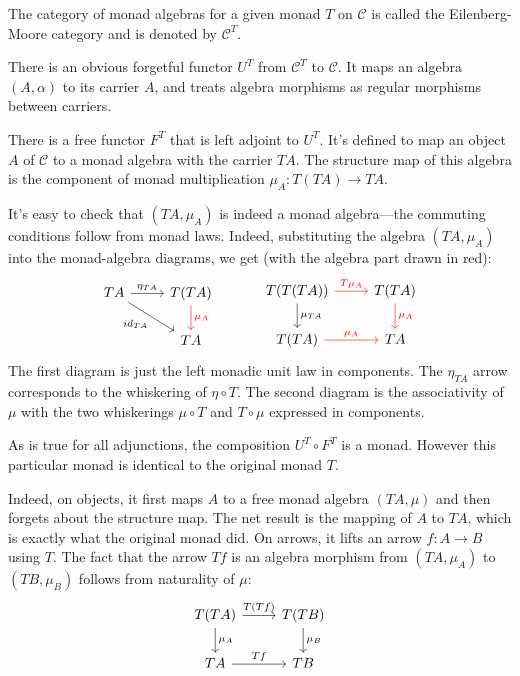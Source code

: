 \documentclass[DaoFP]{subfiles}
\begin{document}
The category of monad algebras for a given monad $T$ on $ \mathcal{C}$ is called the Eilenberg-Moore category and is denoted by $ \mathcal{C}^T$. 

There is an obvious forgetful functor $U^T$ from $ \mathcal{C}^T$ to $ \mathcal{C}$. It maps an algebra $(A, \alpha)$ to its carrier $A$, and treats algebra morphisms as regular morphisms between carriers. 

There is a free functor $F^T$ that is left adjoint to $U^T$. It's defined to map an object $A$ of $ \mathcal{C}$ to a monad algebra with the carrier $T A$. The structure map of this algebra is the component of monad multiplication $\mu_A \colon T(TA) \to TA$. 

It's easy to check that $(T A, \mu_A)$ is indeed a monad algebra---the commuting conditions follow from monad laws. Indeed, substituting the algebra $(T A, \mu_A)$ into the monad-algebra diagrams, we get (with the algebra part drawn in red):
\[
 \begin{tikzcd}
 T A
 \arrow[r, "\eta_{TA}"]
 \arrow[dr, "id_{TA}"']
 & T(T A)
 \arrow[d, red, "\mu_A"]
 \\
 & T A
 \end{tikzcd}
  \hspace{30pt}
 \begin{tikzcd}
T(T(T A))
\arrow[r, red, "T \mu_A "]
\arrow[d, "\mu_{TA}"]
&T(TA)
\arrow[d, red, "\mu_A"]
\\
T (T A)
\arrow[r, red, "\mu_A"]
& T A
 \end{tikzcd}
\]
The first diagram is just the left monadic unit law in components. The $\eta_{T A}$ arrow corresponds to the whiskering of $\eta \circ T$. The second diagram is the associativity of $\mu$ with the two whiskerings $\mu \circ T$ and $T \circ \mu$ expressed in components.

As is true for all adjunctions, the composition $U^T \circ F^T$ is a monad. However this particular monad is identical to the original monad $T$. 

Indeed, on objects, it first maps $A$ to a free monad algebra $(T A, \mu)$ and then forgets about the structure map. The net result is the mapping of $A$ to $T A$, which is exactly what the original monad did. On arrows, it lifts an arrow $f \colon A \to B$ using $T$. The fact that the arrow $T f$ is an algebra morphism from $(T A, \mu_A)$ to $(T B, \mu_B)$ follows from naturality of $\mu$:
\[
 \begin{tikzcd}
 T (T A)
 \arrow[r, "T( T f)"]
 \arrow[d, "\mu_A"]
 & T (T B)
\arrow[d, "\mu_B"]
 \\
 T A
 \arrow[r, "T f"]
 & T B
  \end{tikzcd}
\]
\end{document}
